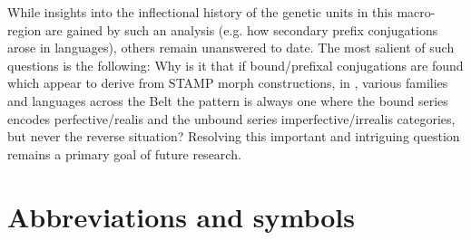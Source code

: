 \documentclass[output=paper]{langsci/langscibook}
\begin{document}
While insights into the inflectional history of the genetic units in this macro-region are gained by such an analysis (e.g. how secondary prefix conjugations arose in  languages), others remain unanswered to date. The most salient of such questions is the following: Why is it that if bound/prefixal conjugations are found which appear to derive from STAMP morph constructions, in , various  families and  languages across the  Belt the pattern is always one where the bound series encodes perfective/realis and the unbound series imperfective/irrealis categories, but never the reverse situation? Resolving this important and intriguing question remains a primary goal of future research. 

\section*{Abbreviations and symbols}

 
\end{document}
